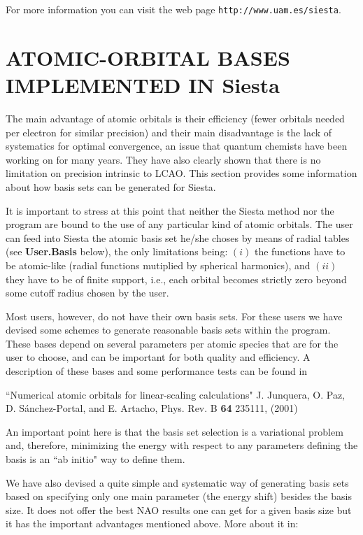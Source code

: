 \documentclass[11pt]{article}
\begin{document}
For more information you can visit the web page 
{\tt http://www.uam.es/siesta}.


\section{ATOMIC-ORBITAL BASES IMPLEMENTED IN {\sc Siesta}}

The main advantage of atomic orbitals is their efficiency (fewer orbitals 
needed per electron for similar precision) 
and their main disadvantage is the lack of systematics for optimal 
convergence, an issue that quantum chemists have been working on for
many years. They have also clearly shown that there
is no limitation on precision intrinsic to LCAO.
This section provides some information about how basis sets can be
generated for {\sc Siesta}.

It is important to stress at this point that neither the {\sc Siesta} 
method nor the program
are bound to the use of any particular kind of atomic orbitals. The
user can feed into {\sc Siesta} the atomic basis set he/she choses by
means of radial tables (see {\bf User.Basis} below), the
only limitations being: $(i)$ the functions have to be atomic-like (radial 
functions mutiplied by spherical harmonics), and $(ii)$ they have to be
of finite support, i.e., each orbital becomes strictly zero beyond some
cutoff radius chosen by the user.

Most users, however, do not have their own basis sets. For these users
we have devised some schemes to generate reasonable basis sets within
the program. These bases depend on several parameters per atomic
species that are for the user to choose, and can be important for both
quality and efficiency. A description of these bases and some
performance tests can be found in

\noindent
``Numerical atomic orbitals for linear-scaling calculations"
J. Junquera, O. Paz, D. S\'anchez-Portal, and E. Artacho, Phys. Rev. B
{\bf 64} 235111, (2001)

An important point here is that the basis set selection is a 
variational problem and, therefore, minimizing the energy with respect
to any parameters defining the basis is an ``ab initio" way to 
define them.

We have also devised a quite simple and systematic way of generating 
basis sets based on specifying only one main parameter (the energy shift)
besides the basis size. It does not offer the best NAO results one can get 
for a given basis size but it has the important advantages mentioned above. 
More about it in:
\end{document}
